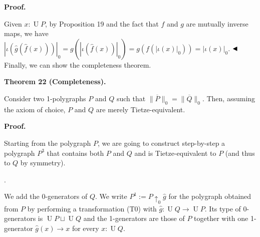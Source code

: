  
 
 
 
\par\medskip\noindent\textbf{Proof.}\par
 
 
Given $x:\operatorname{U}P$, by Proposition 19 and the fact that $f$ and $g$ are mutually inverse maps, we have $|\iota(\hat{g}(\hat{f}(x)))|_{0}=g(|\iota(\hat{f}(x))|_{0})=g(f(|\iota(x)|_{0}))=|\iota(x)|_{0}$. $\hfill\blacktriangleleft$ Finally, we can show the completeness theorem.\par
 
 
 
\par\medskip\noindent\textbf{Theorem 22 (Completeness).}\par
 
 
Consider two 1-polygraphs $P$ and $Q$ such that $\|\overline{P}\|_{0}=\|\overline{Q}\|_{0}$. Then, assuming the axiom of choice, $P$ and $Q$ are merely Tietze-equivalent.\par
 
 
 
 
 
\par\medskip\noindent\textbf{Proof.}\par
 
 
Starting from the polygraph $P$, we are going to construct step-by-step a polygraph $P^{3}$ that contains both $P$ and $Q$ and is Tietze-equivalent to $P$ (and thus to $Q$ by symmetry).\par
  
\par{}. 
 
We add the 0-generators of $Q$. We write $P^{1}:=P{\uparrow_{0}}\hat{g}$ for the polygraph obtained from $P$ by performing a transformation (T0) with $\hat{g}:\operatorname{U}Q\to\operatorname{U}P$. Its type of 0-generators is $\operatorname{U}P\sqcup\operatorname{U}Q$ and the 1-generators are those of $P$ together with one 1-generator $\hat{g}(x)\to x$ for every $x:\operatorname{U}Q$.\par
 
